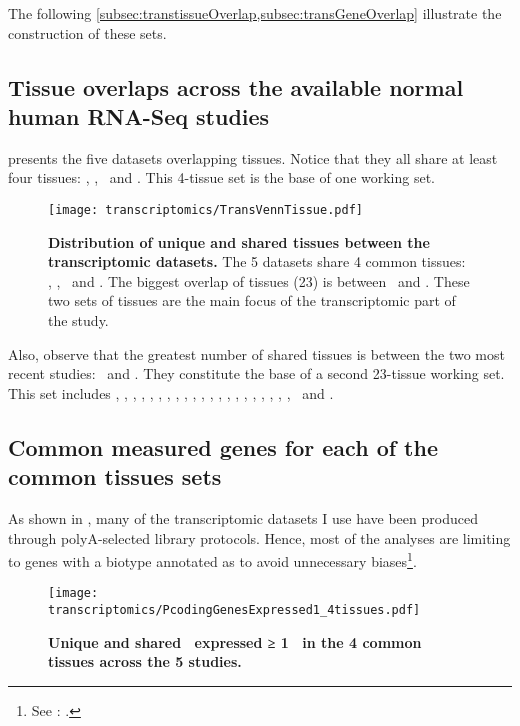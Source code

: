 The following \cref{subsec:transtissueOverlap,subsec:transGeneOverlap}
illustrate the construction of these sets.

\subsection{Tissue overlaps across the available normal human RNA-Seq studies}%
\label{subsec:transtissueOverlap}

 presents the five datasets overlapping tissues.
Notice that they all share at least four tissues:
\heart, \kidney, \liver\ and \testis.
This 4-tissue set is the base of one working set.

\begin{figure}[h]%
\texttt{[image: transcriptomics/TransVennTissue.pdf]}\centering
\caption[Distribution of unique and shared tissues between the
transcriptomic datasets]
{\label{fig:VennStudiesT}\textbf{Distribution of unique and shared tissues
between the transcriptomic datasets.} The 5 datasets share 4
common tissues: \heart, \kidney, \liver\ and \testis.
The biggest overlap of tissues (23) is between \uhlen\ and \gtex.
These two sets of tissues are the main focus of the transcriptomic part of the
study.}
\end{figure}

Also, observe that the greatest number of shared tissues is
between the two most recent studies:
\uhlen\ and \gtex.
They constitute the base of a second 23-tissue working set.
This set includes
\Adipose, \Adrenal, \Bladder, \Cortex, \hcolon, \Esophagus,
\Fallopian, \heart, \kidney, \liver, \lung, \Ovary, \Pancreas, \Prostate,
\salivary, \skeletal, \skin, \intestine, \spleen, \stomach, \testis,
\thyroid\ and \uterus.

\subsection{Common measured genes for each of the common tissues sets}%
\label{subsec:transGeneOverlap}
As shown in ,
many of the transcriptomic datasets I use have been produced through
polyA-selected library protocols.
Hence, most of the analyses are limiting to genes with a biotype annotated as
\emph{\pc}
to avoid unnecessary biases\footnote{See
: .}.

\begin{figure}[!htpb]
    \texttt{[image: transcriptomics/PcodingGenesExpressed1\_4tissues.pdf]}\centering
    \caption[Unique and shared \pcgs\ expressed
    in the 4 common tissues (≥1 \FPKM)]{\label{fig:ExpGenePcoding1}\textbf{Unique
    and shared \pcgs\ expressed ≥ 1 \FPKM\ in the 4 common tissues
    across the 5 studies.}}
\end{figure}

